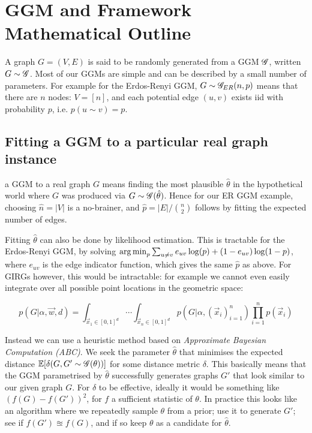 

\section{GGM and Framework Mathematical Outline}
A graph $G = (V,E)$ is said to be randomly generated from a GGM $\mathscr{G}$, written $G \sim \mathscr{G}$. Most of our GGMs are simple and can be described by a small number of parameters. For example for the Erdos-Renyi GGM, $G \sim \mathscr{G}_{ER}(n, p)$ means that there are $n$ nodes: $V=[n]$, and each potential edge $(u,v)$ exists iid with probability $p$, i.e. $p(u \sim v) = p$.

\subsection{Fitting a GGM to a particular real graph instance}
\label{sec:fitting_GGM}
 a GGM to a real graph $G$ means finding the most plausible $\hat{\theta}$ in the hypothetical world where $G$ was produced via $G \sim \mathscr{G}(\hat{\theta})$. Hence for our ER GGM example, choosing $\hat{n} = |V|$ is a no-brainer, and $\hat{p} = |E| / \binom{n}{2}$ follows by fitting the expected number of edges.

Fitting $\hat{\theta}$ can also be done by likelihood estimation. This is tractable for the Erdos-Renyi GGM, by solving $\operatorname*{arg\,min}_p \sum_{u \neq v} e_{uv} \log(p) + (1 - e_{uv}) \log( 1 - p)$, where $e_{uv}$ is the edge indicator function, which gives the same $\hat{p}$ as above. For GIRGs however, this would be intractable: for example we cannot even easily integrate over all possible point locations in the geometric space:

\begin{equation*}
    p(G | \alpha, \vec{w}, d) = \int_{\vec{x}_1 \in [0,1]^d} \cdots \int_{\vec{x}_n \in [0,1]^d} p(G | \alpha, (\vec{x}_i)_{i=1}^n) \prod_{i=1}^n p(\vec{x}_i)
\end{equation*}

Instead we can use a heuristic method based on \textit{Approximate Bayesian Computation (ABC)}. We seek the parameter $\hat{\theta}$ that minimises the expected distance $ \mathbb{E}[\delta(G, G' \sim \mathscr{G}(\theta))]$ for some distance metric $\delta$. This basically means that the GGM parametrised by $\hat{\theta}$ successfully generates graphs $G'$ that look similar to our given graph $G$.
For $\delta$ to be effective, ideally it would be something like $(f(G) - f(G'))^2$, for $f$ a sufficient statistic of $\theta$. In practice this looks like an algorithm where we repeatedly sample $\theta$ from a prior; use it to generate $G'$; see if $f(G') \approxeq f(G)$, and if so keep $\theta$ as a candidate for $\hat{\theta}$.

